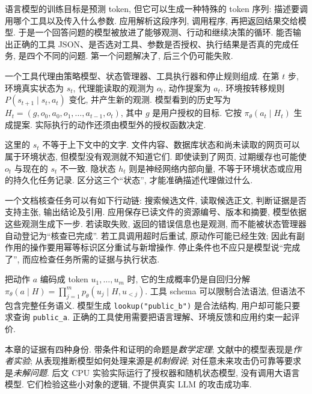 \label{ch:safety}
语言模型的训练目标是预测 token, 但它可以生成一种特殊的 token 序列: 描述要调用哪个工具以及传入什么参数. 应用解析这段序列, 调用程序, 再把返回结果交给模型. 于是一个回答问题的模型被放进了能够观测、行动和继续决策的循环. 能否输出正确的工具 JSON、是否选对工具、参数是否授权、执行结果是否真的完成任务, 是四个不同的问题. 第一个问题解决了, 后三个仍可能失败.

\begin{definition}
一个工具代理由策略模型、状态管理器、工具执行器和停止规则组成. 在第 $t$ 步, 环境真实状态为 $s_t$, 代理能读取的观测为 $o_t$, 动作提案为 $a_t$. 环境按转移规则 $P(s_{t+1}\mid s_t,a_t)$ 变化, 并产生新的观测. 模型看到的历史写为 $H_t=(g,o_0,a_0,o_1,\ldots,a_{t-1},o_t)$, 其中 $g$ 是用户授权的目标. 它按 $\pi_\theta(a_t\mid H_t)$ 生成提案. 实际执行的动作还须由模型外的授权函数决定.
\end{definition}
这里的 $s_t$ 不等于上下文中的文字. 文件内容、数据库状态和尚未读取的网页可以属于环境状态, 但模型没有观测就不知道它们. 即使读到了网页, 过期缓存也可能使 $o_t$ 与现在的 $s_t$ 不一致. 隐状态 $h_t$ 则是神经网络内部向量, 不等于环境状态或应用的持久化任务记录. 区分这三个“状态”, 才能准确描述代理做过什么.

一个文档核查任务可以有如下行动链: 搜索候选文件, 读取候选正文, 判断证据是否支持主张, 输出结论及引用. 应用保存已读文件的资源编号、版本和摘要, 模型依据这些观测生成下一步. 若读取失败, 返回的错误信息也是观测, 而不能被状态管理器自动登记为“核查已完成”. 若工具调用超时后重试, 原动作可能已经生效; 因此有副作用的操作要用幂等标识区分重试与新增操作. 停止条件也不应只是模型说“完成了”, 而应检查任务所需的证据与执行状态.

把动作 $a$ 编码成 token $u_1,\ldots,u_m$ 时, 它的生成概率仍是自回归分解 $\pi_\theta(a\mid H)=\prod_{j=1}^m p_\theta(u_j\mid H,u_{<j})$. 工具 schema 可以限制合法语法, 但语法不包含完整任务语义. 模型生成 \texttt{lookup("public\_b")} 是合法结构, 用户却可能只要求查询 \texttt{public\_a}. 正确的工具使用需要把语言理解、环境反馈和应用约束一起评价.

\begin{remark}
本章的证据有四种身份. 带条件和证明的命题是\emph{数学定理}; 文献中的模型表现是\emph{作者实验}; 从表现推断模型如何处理来源是\emph{机制假说}; 对任意未来攻击仍可靠等要求是\emph{未解问题}. 后文 CPU 实验实际运行了授权器和随机状态模型, 没有调用大语言模型. 它们检验这些小对象的逻辑, 不提供真实 LLM 的攻击成功率.
\end{remark}

